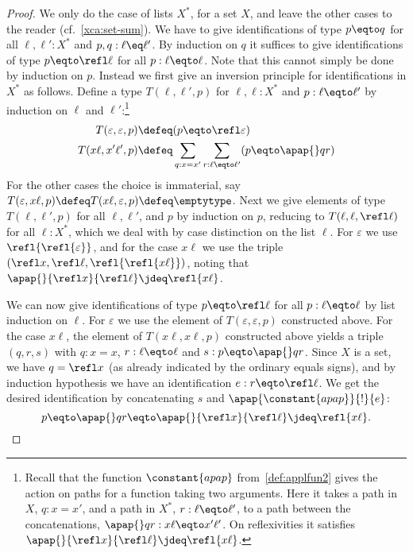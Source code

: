 \begin{proof}
  We only do the case of lists $X^*$, for a set $X$,
  and leave the other cases to the reader
  (cf.\ \cref{xca:set-sum}).
  We have to give identifications of type $p \eqto q$ for all $\ell, \ell' : X^*$
  and $p, q : \ell \eq \ell'$.
  By induction on $q$ it suffices to give identifications of type
  $p \eqto \refl \ell$ for all $p : \ell \eqto \ell$.
  Note that this cannot simply be done by induction on $p$.
  Instead we first give an inversion principle for
  identifications in $X^*$ as follows. Define a type $T(\ell,\ell',p)$
  for $\ell, \ell : X^*$ and $p : \ell \eqto \ell'$
  by induction on $\ell$ and $\ell'$:\footnote{%
    Recall that the function $\constant{apap}$ from~\cref{def:applfun2}
    gives the action on paths for a function taking two arguments.
    Here it takes a path in $X$, $q : x = x'$, and a path in $X^*$,
    $r : \ell \eqto \ell'$, to a path between the concatenations,
    $\apap{} q r : x\ell \eqto x'\ell'$.
    On reflexivities it satisfies $\apap{}{\refl x}{\refl\ell} \jdeq \refl{x\ell}$.}
  \begin{align*}
    T(\varepsilon,\varepsilon,p) &\defeq (p \eqto \refl\varepsilon) \\
    T(x\ell, x'\ell', p) &\defeq \sum_{q : x = x'}\sum_{r : \ell \eqto \ell'}(p \eqto \apap{} q r)
  \end{align*}
  For the other cases the choice is immaterial,
  say $T(\varepsilon, x\ell, p) \defeq T(x\ell, \varepsilon ,p) \defeq \emptytype$.
  Next we give elements of type $T(\ell,\ell',p)$
  for all $\ell,\ell'$, and $p$ by induction on $p$, reducing to
  $T(\ell,\ell,\refl\ell)$ for all $\ell : X^*$, which we deal with by
  case distinction on the list $\ell$.
  For $\varepsilon$ we use $\refl{\refl{\varepsilon}}$,
  and for the case $x\ell$
  we use the triple $(\refl x,\refl\ell,\refl{\refl{x\ell}})$,
  noting that $\apap{}{\refl x}{\refl\ell} \jdeq \refl{x\ell}$.

  We can now give identifications of type $p \eqto \refl\ell$ for all
  $p : \ell \eqto \ell$ by list induction on $\ell$.
  For $\varepsilon$ we use the element of  $T(\varepsilon,\varepsilon,p)$ constructed above.
  For the case $x\ell$, the element of $T(x\ell,x\ell,p)$
  constructed above yields a triple $(q,r,s)$ with $q : x = x$,
  $r : \ell \eqto \ell$ and
  $s : p \eqto \apap{} q r$. Since $X$ is a set, we have $q = \refl x$
  (as already indicated by the ordinary equals signs),
  and by induction hypothesis we have
  an identification $e : r \eqto \refl\ell$. We get the desired
  identification by concatenating $s$ and $\apap{\constant{apap}}{!}{e}$:
  \[
    p \eqto \apap{} q r \eqto \apap{}{\refl x}{\refl\ell}
    \jdeq \refl{x\ell}.\qedhere
  \]
\end{proof}

